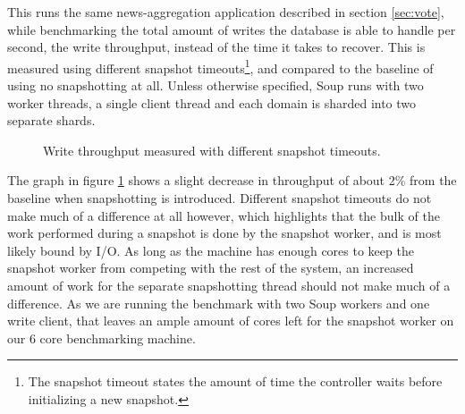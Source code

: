\documentclass[b5paper]{report}
\begin{document}
This runs the same news-aggregation application described in section
\ref{sec:vote}, while benchmarking the total amount of writes the database is
able to handle per second, the write throughput, instead of the time it takes to
recover. This is measured using different snapshot timeouts\footnote{The
snapshot timeout states the amount of time the controller waits before
initializing a new snapshot.}, and compared to the baseline of using no
snapshotting at all. Unless otherwise specified, Soup runs with two worker
threads, a single client thread and each domain is sharded into two separate
shards.

\begin{figure}
  \centering

  \caption{
    Write throughput measured with different snapshot timeouts.
    \label{fig:throughput}
  }
\end{figure}

The graph in figure \ref{fig:throughput} shows a slight decrease in throughput
of about 2\% from the baseline when snapshotting is introduced. Different
snapshot timeouts do not make much of a difference at all however, which
highlights that the bulk of the work performed during a snapshot is done by the
snapshot worker, and is most likely bound by I/O. As long as the machine has
enough cores to keep the snapshot worker from competing with the rest of the
system, an increased amount of work for the separate snapshotting thread should
not make much of a difference. As we are running the benchmark with two Soup
workers and one write client, that leaves an ample amount of cores left for the
snapshot worker on our 6 core benchmarking machine.
\end{document}

